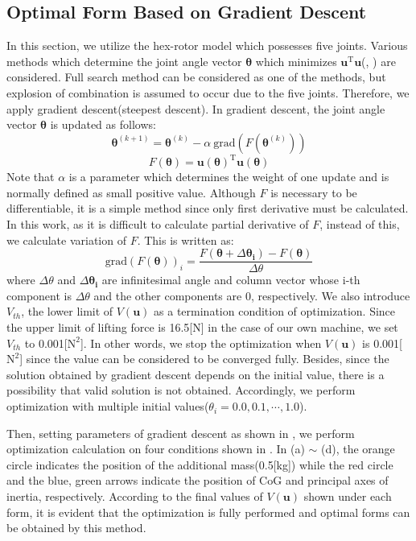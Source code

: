 \subsection{Optimal Form Based on Gradient Descent}
In this section, we utilize the hex-rotor model which possesses five joints. Various methods which determine the joint angle vector $\bm{\theta}$ which minimizes $\bm{u}^\mathrm{T}\bm{u}$(, ) are considered. Full search method\cite{ZhaoICRA2017} can be considered as one of the methods, but explosion of combination is assumed to occur due to the five joints. Therefore, we apply gradient descent(steepest descent)\cite{OZEKI2003}.
 In gradient descent, the joint angle vector $\bm{\theta}$ is updated as follows:
\begin{equation}
  \bm{\theta}^{(k+1)} = \bm{\theta}^{(k)}-\alpha \ \text{grad}(F(\bm{\theta}^{(k)}))
  \label{eq:steepest_descent_method}
\end{equation}
\begin{equation*}
  F(\bm{\theta})=\bm{u}(\bm{\theta})^\mathrm{T}\bm{u}(\bm{\theta})
\end{equation*}
Note that $\alpha$ is a parameter which determines the weight of one update and is normally defined as small positive value. Although $F$ is necessary to be differentiable, it is a simple method since only first derivative must be calculated. In this work, as it is difficult to calculate partial derivative of $F$, instead of this, we calculate variation of $F$. This is written as:
\begin{equation}
  \text{grad}(F(\bm{\theta}))_i=\frac{F(\bm{\theta}+\Delta \bm{\theta_i})-F(\bm{\theta})}{\Delta \theta}
  \label{eq:grad}
\end{equation}
where $\Delta \theta$ and $\Delta \bm{\theta_i}$ are infinitesimal angle and column vector whose i-th component is $\Delta \theta$ and the other components are 0, respectively. We also introduce $V_{th}$, the lower limit of $V(\bm{u})$ as a termination condition of optimization. Since the upper limit of lifting force is 16.5[N] in the case of our own machine, we set $V_{th}$ to 0.001[$\text{N}^2$]. In other words, we stop the optimization when $V(\bm{u})$ is 0.001[$\text{N}^2$] since the value can be considered to be converged fully. Besides, since the solution obtained by gradient descent depends on the initial value, there is a possibility that valid solution is not obtained. Accordingly, we perform optimization with multiple initial values($\theta_i = 0.0, 0.1, \cdots, 1.0$). 
\par
Then, setting parameters of gradient descent as shown in , we perform optimization calculation on four conditions shown in . In (a) $\sim$ (d), the orange circle indicates the position of the additional mass(0.5[kg]) while the red circle and the blue, green arrows indicate the position of CoG and principal axes of inertia, respectively. According to the final values of $V(\bm{u})$ shown under each form, it is evident that the optimization is fully performed and optimal forms can be obtained by this method.

